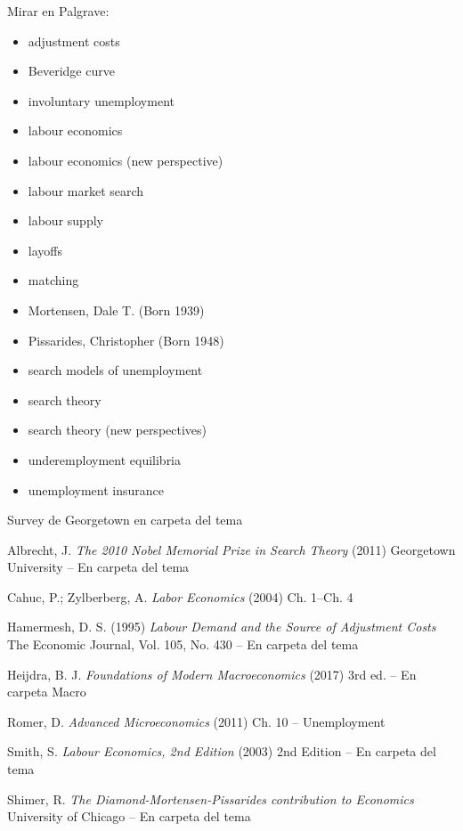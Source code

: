 \documentclass{nuevotema}
\begin{document}
\preguntas

\notas

\bibliografia

Mirar en Palgrave:
\begin{itemize}
	\item adjustment costs
	\item Beveridge curve
	\item involuntary unemployment
	\item labour economics
	\item labour economics (new perspective)
	\item labour market search
	\item labour supply
	\item layoffs
	\item matching
	\item Mortensen, Dale T. (Born 1939)
	\item Pissarides, Christopher (Born 1948)
	\item search models of unemployment
	\item search theory
	\item search theory (new perspectives)
	\item underemployment equilibria
	\item unemployment insurance
\end{itemize} 

Survey de Georgetown en carpeta del tema

Albrecht, J. \textit{The 2010 Nobel Memorial Prize in Search Theory} (2011) Georgetown University -- En carpeta del tema

Cahuc, P.; Zylberberg, A. \textit{Labor Economics} (2004) Ch. 1--Ch. 4

Hamermesh, D. S. (1995) \textit{Labour Demand and the Source of Adjustment Costs} The Economic Journal, Vol. 105, No. 430 -- En carpeta del tema

Heijdra, B. J. \textit{Foundations of Modern Macroeconomics} (2017) 3rd ed. -- En carpeta Macro

Romer, D. \textit{Advanced Microeconomics} (2011) Ch. 10 -- Unemployment

Smith, S. \textit{Labour Economics, 2nd Edition} (2003) 2nd Edition -- En carpeta del tema

Shimer, R. \textit{The Diamond-Mortensen-Pissarides contribution to Economics} University of Chicago -- En carpeta del tema
\end{document}
